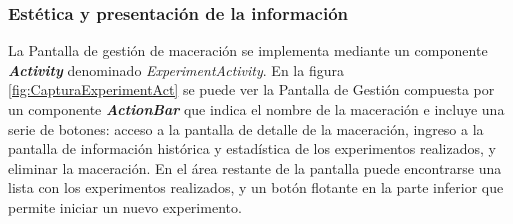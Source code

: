             \subsubsection{Estética y presentación de la información}
                \par La Pantalla de gestión de maceración se implementa mediante un componente \textbf{\textit{\gls{Activity}}} denominado \textit{ExperimentActivity}. En la figura \ref{fig:CapturaExperimentAct} se puede ver la Pantalla de Gestión compuesta por un componente \textbf{\textit{\gls{ActionBar}}} que indica el nombre de la maceración e incluye una serie de botones: acceso a la pantalla de detalle de la maceración, ingreso a la pantalla de información histórica y estadística de los experimentos realizados, y  eliminar la maceración. En el área restante de la pantalla puede encontrarse una lista con los experimentos realizados, y un botón flotante en la parte inferior que permite iniciar un nuevo experimento. %
